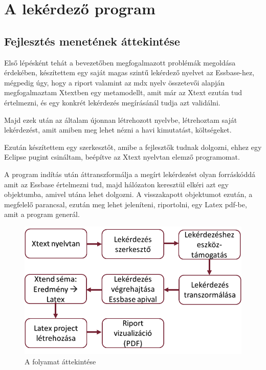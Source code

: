\chapter{A lekérdező program}\label{sect:Ellaboration}
\section{Fejlesztés menetének áttekintése}
Első lépésként tehát a bevezetőben megfogalmazott problémák megoldása érdekében,
készítettem egy saját magas szintű lekérdező nyelvet az Essbase-hez, mégpedig
úgy, hogy a riport valamint az mdx nyelv összetevői alapján megfogalmaztam
Xtextben egy metamodellt, amit már az Xtext ezután tud értelmezni, és egy
konkrét lekérdezés megírásánál tudja azt validálni.

Majd ezek után az általam újonnan létrehozott nyelvbe, létrehoztam saját
lekérdezést, amit amiben meg lehet nézni a havi kimutatást, költségeket.

Ezután készítettem egy szerkesztőt, amibe a fejlesztők tudnak dolgozni, ehhez
egy Eclipse pugint csináltam, beépítve az Xtext nyelvtan elemző programomat. 

A program indítás után áttranszformálja a megírt lekérdezést olyan forráskóddá
amit az Essbase értelmezni tud, majd hálózaton keresztül elkéri azt egy
objektumba, amivel utána lehet dolgozni. A visszakapott objektumot ezután, a
megfelelő parancsal, ezután meg lehet jeleníteni, riportolni, egy Latex pdf-be,
amit a program generál.

 \begin{figure}[!ht]
\centering
\includegraphics[width=120mm, keepaspectratio]{figures/overview.png}
\caption{A folyamat áttekintése} 
\label{fig:Overview}
\end{figure}

